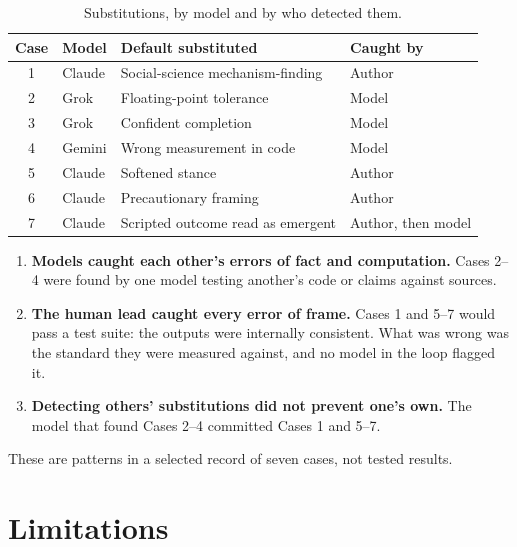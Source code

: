\documentclass[11pt]{article}
\begin{document}
\begin{table}[h]
\centering
\small
\begin{tabularx}{\linewidth}{@{}clXl@{}}
\toprule
Case & Model & Default substituted & Caught by \\
\midrule
1 & Claude & Social-science mechanism-finding & Author \\
2 & Grok & Floating-point tolerance & Model \\
3 & Grok & Confident completion & Model \\
4 & Gemini & Wrong measurement in code & Model \\
5 & Claude & Softened stance & Author \\
6 & Claude & Precautionary framing & Author \\
7 & Claude & Scripted outcome read as emergent & Author, then model \\
\bottomrule
\end{tabularx}
\caption{Substitutions, by model and by who detected them.}
\end{table}

\begin{enumerate}
\item \textbf{Models caught each other's errors of fact and computation.}
Cases 2--4 were found by one model testing another's code or claims against
sources.
\item \textbf{The human lead caught every error of frame.} Cases 1 and 5--7
would pass a test suite: the outputs were internally consistent. What was
wrong was the standard they were measured against, and no model in the loop
flagged it.
\item \textbf{Detecting others' substitutions did not prevent one's own.}
The model that found Cases 2--4 committed Cases 1 and 5--7.
\end{enumerate}

These are patterns in a selected record of seven cases, not tested results.

\section{Limitations}
\end{document}

